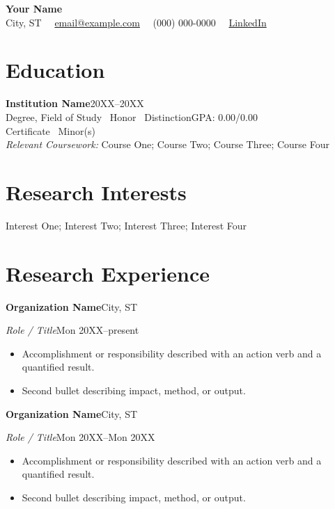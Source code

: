 \documentclass[10pt]{extarticle}
\newcommand{\entry}[5]{%
  \noindent\textbf{#1}\hfill #2\par
  \noindent\textit{#3}\hfill #4\par
  \begin{itemize}#5\end{itemize}%
}
\newcommand{\entrygap}{\vspace{0.5em}}
\begin{document}
\thispagestyle{empty}

\begin{center}
  {\LARGE\textbf{Your Name}}\\[0.5em]
  City, ST~\textperiodcentered~%
  \href{mailto:email@example.com}{email@example.com}~\textperiodcentered~%
  (000) 000-0000~\textperiodcentered~%
  \href{https://example.com}{LinkedIn}
\end{center}

\section*{Education}
\textbf{Institution Name}\hfill 20XX--20XX\\
Degree, Field of Study \textperiodcentered\ Honor \textperiodcentered\ Distinction\hfill GPA: 0.00/0.00\\
Certificate \textperiodcentered\ Minor(s)\\[0.4em]
\textit{Relevant Coursework:} Course One; Course Two; Course Three; Course Four

\section*{Research Interests}
Interest One; Interest Two; Interest Three; Interest Four

\section*{Research Experience}
\entry
  {Organization Name}{City, ST}
  {Role / Title}{Mon 20XX--present}
  {\item Accomplishment or responsibility described with an action verb and a quantified result.
   \item Second bullet describing impact, method, or output.}
\entrygap
\entry
  {Organization Name}{City, ST}
  {Role / Title}{Mon 20XX--Mon 20XX}
  {\item Accomplishment or responsibility described with an action verb and a quantified result.
   \item Second bullet describing impact, method, or output.}
\end{document}
